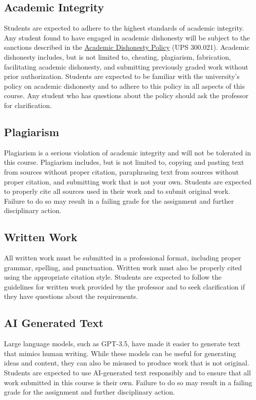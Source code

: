 \documentclass[12pt, letterpaper]{article}
\begin{document}
\subsection*{Academic Integrity}
Students are expected to adhere to the highest standards of academic integrity. Any student found to have engaged in academic dishonesty will be subject to the sanctions described in the \href{https://www.fullerton.edu/senate/publications_policies_resolutions/ups/UPS%20300/UPS%20300.021.pdf}{Academic Dishonesty Policy} (UPS 300.021). Academic dishonesty includes, but is not limited to, cheating, plagiarism, fabrication, facilitating academic dishonesty, and submitting previously graded work without prior authorization. Students are expected to be familiar with the university's policy on academic dishonesty and to adhere to this policy in all aspects of this course. Any student who has questions about the policy should ask the professor for clarification.

\subsection*{Plagiarism}
Plagiarism is a serious violation of academic integrity and will not be tolerated in this course. Plagiarism includes, but is not limited to, copying and pasting text from sources without proper citation, paraphrasing text from sources without proper citation, and submitting work that is not your own. Students are expected to properly cite all sources used in their work and to submit original work. Failure to do so may result in a failing grade for the assignment and further disciplinary action.

\subsection*{Written Work}
All written work must be submitted in a professional format, including proper grammar, spelling, and punctuation. Written work must also be properly cited using the appropriate citation style. Students are expected to follow the guidelines for written work provided by the professor and to seek clarification if they have questions about the requirements.

\subsection*{AI Generated Text} 
Large language models, such as GPT-3.5, have made it easier to generate text that mimics human writing. While these models can be useful for generating ideas and content, they can also be misused to produce work that is not original. Students are expected to use AI-generated text responsibly and to ensure that all work submitted in this course is their own. Failure to do so may result in a failing grade for the assignment and further disciplinary action.
\end{document}
